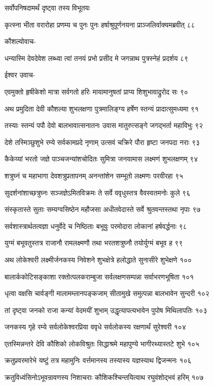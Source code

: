 सर्वोपनिषदामर्थं दृष्ट्वा तस्य विभूतयः

कृत्स्ना भीता वरारोहा प्रणम्य च पुनः पुनः
हर्षाश्रुपूर्णनयना प्राञ्जलिर्वाक्यमब्रवीत् ८८

कौशल्योवाच-

धन्यास्मि देवदेवेश लब्ध्वा त्वां तनयं प्रभो
प्रसीद मे जगन्नाथ पुत्रस्नेहं प्रदर्शय ८९

ईश्वर उवाच-

एवमुक्तो हृषीकेशो मात्रा सर्वगतो हरिः
मायामानुषतां प्राप्य शिशुभावाद्रुरोद सः ९०

अथ प्रमुदिता देवी कौशल्या शुभलक्षणा
पुत्रमालिङ्ग्य हर्षेण स्तन्यं प्रादात्सुमध्यमा ९१

तस्याः स्तन्यं पपौ देवो बालभावात्सनातनः
उवास मातुरुत्सङ्गे जगद्भर्ता महाविभुः ९२

देशे तस्मिञ्छुशुभे रम्ये सर्वकामप्रदे नृणाम्
उत्सवं चक्रिरे पौरा हृष्टा जनपदा नराः ९३

कैकेय्यां भरतो जज्ञे पाञ्चजन्यांशचोदितः
सुमित्रा जनयामास लक्ष्मणं शुभलक्षणम् ९४

शत्रुघ्नं च महाभागा देवशत्रुप्रतापनम्
अनन्तांशेन सम्भूतो लक्ष्मणः परवीरहा ९५

सुदर्शनांशाच्छत्रुघ्नः सञ्जज्ञेऽमितविक्रमः
ते सर्वे ववृधुस्तत्र वैवस्वतमनोः कुले ९६

संस्कृतास्ते सुताः सम्यग्वसिष्ठेन महौजसा
अधीतवेदास्ते सर्वे श्रुतवन्तस्तथा नृपाः ९७

सर्वशास्त्रार्थतत्वज्ञा धनुर्वेदे च निष्ठिताः
बभूवुः परमोदारा लोकानां हर्षवर्द्धनाः ९८

युग्मं बभूवतुस्तत्र राजानौ रामलक्ष्मणौ
तथा भरतशत्रुघ्नौ तयोर्युग्मं बभूव ह ९९

अथ लोकेश्वरी लक्ष्मीर्जनकस्य निवेशने
शुभक्षेत्रे हलोद्धाते सुनासीरे शुभेक्षणे १००

बालार्ककोटिसङ्काशा रक्तोत्पलकराम्बुजा
सर्वलक्षणसम्पन्ना सर्वाभरणभूषिता १०१

धृत्वा वक्षसि चार्वङ्गी मालामम्लानपङ्कजाम्
सीतामुखे समुत्पन्ना बालभावेन सुन्दरी १०२

तां दृष्ट्वा जनको राजा कन्यां वेदमयीं शुभाम्
उद्धृत्यापत्यभावेन पुपोष मिथिलापतिः १०३

जनकस्य गृहे रम्ये सर्वलोकेश्वरप्रिया
ववृधे सर्वलोकस्य रक्षणार्थं सुरेश्वरी १०४

एतस्मिन्नन्तरे देवि कौशिको लोकविश्रुतः
सिद्धाश्रमे महापुण्ये भागीरथ्यास्तटे शुभे १०५

क्रतुप्रवरमारेभे यष्टुं तत्र महामुनिः
वर्त्तमानस्य तस्यास्य यज्ञस्याथ द्विजन्मनः १०६

क्रतुविध्वंसिनोऽभूवन्रावणस्य निशाचराः
कौशिकश्चिन्तयित्वाथ रघुवंशोद्भवं हरिम् १०७

